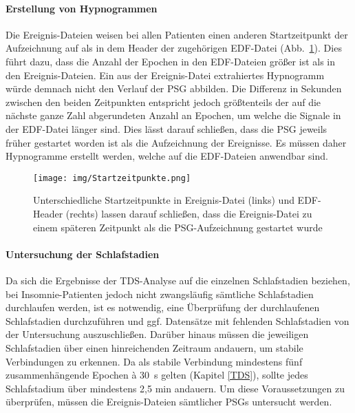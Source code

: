 \paragraph{Erstellung von Hypnogrammen} Die Ereignis-Dateien weisen bei allen Patienten einen anderen Startzeitpunkt der Aufzeichnung auf als in dem Header der zugehörigen \acs{EDF}-Datei (Abb.~\ref{fig:zeitpunkte}). Dies führt dazu, dass die Anzahl der Epochen in den \acs{EDF}-Dateien größer ist als in den Ereignis-Dateien. Ein aus der Ereignis-Datei extrahiertes Hypnogramm würde demnach nicht den Verlauf der \acs{PSG} abbilden. Die Differenz in Sekunden zwischen den beiden Zeitpunkten entspricht jedoch größtenteils der auf die nächste ganze Zahl abgerundeten Anzahl an Epochen, um welche die Signale in der \acs{EDF}-Datei länger sind. Dies lässt darauf schließen, dass die \acs{PSG} jeweils früher gestartet worden ist als die Aufzeichnung der Ereignisse. Es müssen daher Hypnogramme erstellt werden, welche auf die \acs{EDF}-Dateien anwendbar sind.

\begin{figure}[H]
	\centering
	\texttt{[image: img/Startzeitpunkte.png]}
	\caption[Startzeitpunkte von Ereignis- und \acs{EDF}-Datei]{Unterschiedliche Startzeitpunkte in Ereignis-Datei (links) und \acs{EDF}-Header (rechts) lassen darauf schließen, dass die Ereignis-Datei zu einem späteren Zeitpunkt als die \acs{PSG}-Aufzeichnung gestartet wurde}
	\label{fig:zeitpunkte}
\end{figure}

\paragraph{Untersuchung der Schlafstadien} 
Da sich die Ergebnisse der \acs{TDS}-Analyse auf die einzelnen Schlafstadien beziehen, bei Insomnie-Patienten jedoch nicht zwangsläufig sämtliche Schlafstadien durchlaufen werden, ist es notwendig, eine Überprüfung der durchlaufenen Schlafstadien durchzuführen und ggf. Datensätze mit fehlenden Schlafstadien von der Untersuchung auszuschließen. Darüber hinaus müssen die jeweiligen Schlafstadien über einen hinreichenden Zeitraum andauern, um stabile Verbindungen zu erkennen. Da als stabile Verbindung mindestens fünf zusammenhängende Epochen \`{a} 30~s gelten (Kapitel \ref{TDS}), sollte jedes Schlafstadium über mindestens 2,5 min andauern. Um diese Voraussetzungen zu überprüfen, müssen die Ereignis-Dateien sämtlicher \acs{PSG}s untersucht werden.

